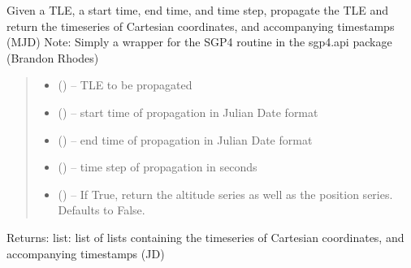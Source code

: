 \documentclass[letterpaper,10pt,english]{sphinxmanual}
\begin{document}

\begin{fulllineitems}
\label{\detokenize{fspsim.utils:fspsim.utils.Propagators.sgp4_prop_TLE}}
\pysigstartsignatures
{}
\pysigstopsignatures
\sphinxAtStartPar
Given a TLE, a start time, end time, and time step, propagate the TLE and return the time\sphinxhyphen{}series of Cartesian coordinates, and accompanying time\sphinxhyphen{}stamps (MJD)
Note: Simply a wrapper for the SGP4 routine in the sgp4.api package (Brandon Rhodes)
\begin{quote}\begin{description}
\begin{itemize}
\item {} 
\sphinxAtStartPar
{} () – TLE to be propagated

\item {} 
\sphinxAtStartPar
{} () – start time of propagation in Julian Date format

\item {} 
\sphinxAtStartPar
{} () – end time of propagation in Julian Date format

\item {} 
\sphinxAtStartPar
{} () – time step of propagation in seconds

\item {} 
\sphinxAtStartPar
{} (\sphinxstyleliteralemphasis{\sphinxupquote{, }}) – If True, return the altitude series as well as the position series. Defaults to False.

\end{itemize}

\end{description}\end{quote}

\sphinxAtStartPar
Returns:
list: list of lists containing the time\sphinxhyphen{}series of Cartesian coordinates, and accompanying time\sphinxhyphen{}stamps (JD)

\end{fulllineitems}
\end{document}
